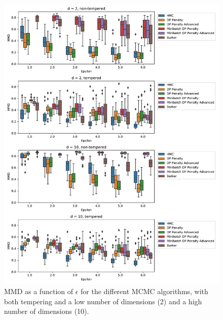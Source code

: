 \documentclass[english,twoside,openright]{HYgraduMLDS}
\begin{document}
\begin{figure}
  \centering
  \includegraphics[width=\textwidth]{figures/banana_mmd.pdf}
  \caption{
    MMD as a function of \(\epsilon\) for the different MCMC algorithms,
    with both tempering and a low number of dimensions (2) and a high number
    of dimensions (10).
  }
  \label{banana_mmd_fig}

\end{figure}
\end{document}
